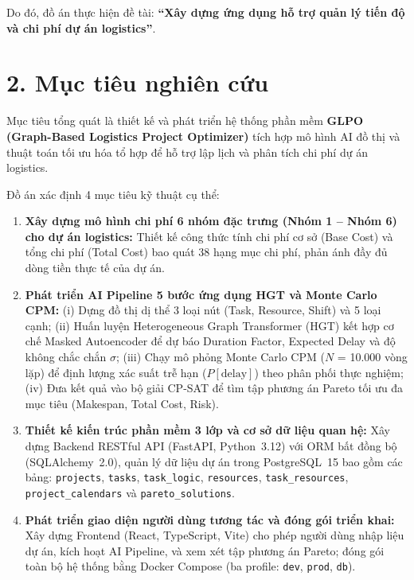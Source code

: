 Do đó, đồ án thực hiện đề tài: \textbf{``Xây dựng ứng dụng hỗ trợ quản lý tiến độ và chi phí dự án logistics''}.

\section*{2. Mục tiêu nghiên cứu}

Mục tiêu tổng quát là thiết kế và phát triển hệ thống phần mềm \textbf{GLPO (Graph-Based Logistics Project Optimizer)} tích hợp mô hình AI đồ thị và thuật toán tối ưu hóa tổ hợp để hỗ trợ lập lịch và phân tích chi phí dự án logistics.

Đồ án xác định 4 mục tiêu kỹ thuật cụ thể:

\begin{enumerate}
    \item \textbf{Xây dựng mô hình chi phí 6 nhóm đặc trưng (Nhóm 1 -- Nhóm 6) cho dự án logistics:} Thiết kế công thức tính chi phí cơ sở (Base Cost) và tổng chi phí (Total Cost) bao quát 38 hạng mục chi phí, phản ánh đầy đủ dòng tiền thực tế của dự án.

    \item \textbf{Phát triển AI Pipeline 5 bước ứng dụng HGT và Monte Carlo CPM:} (i) Dựng đồ thị dị thể 3 loại nút (Task, Resource, Shift) và 5 loại cạnh; (ii) Huấn luyện Heterogeneous Graph Transformer (HGT) kết hợp cơ chế Masked Autoencoder để dự báo Duration Factor, Expected Delay và độ không chắc chắn $\sigma$; (iii) Chạy mô phỏng Monte Carlo CPM ($N$ = 10.000 vòng lặp) để định lượng xác suất trễ hạn ($P[\text{delay}]$) theo phân phối thực nghiệm; (iv) Đưa kết quả vào bộ giải CP-SAT để tìm tập phương án Pareto tối ưu đa mục tiêu (Makespan, Total Cost, Risk).

    \item \textbf{Thiết kế kiến trúc phần mềm 3 lớp và cơ sở dữ liệu quan hệ:} Xây dựng Backend RESTful API (FastAPI, Python~3.12) với ORM bất đồng bộ (SQLAlchemy~2.0), quản lý dữ liệu dự án trong PostgreSQL~15 bao gồm các bảng: \texttt{projects}, \texttt{tasks}, \texttt{task\_logic}, \texttt{resources}, \texttt{task\_resources}, \texttt{project\_calendars} và \texttt{pareto\_solutions}.

    \item \textbf{Phát triển giao diện người dùng tương tác và đóng gói triển khai:} Xây dựng Frontend (React, TypeScript, Vite) cho phép người dùng nhập liệu dự án, kích hoạt AI Pipeline, và xem xét tập phương án Pareto; đóng gói toàn bộ hệ thống bằng Docker Compose (ba profile: \texttt{dev}, \texttt{prod}, \texttt{db}).
\end{enumerate}


